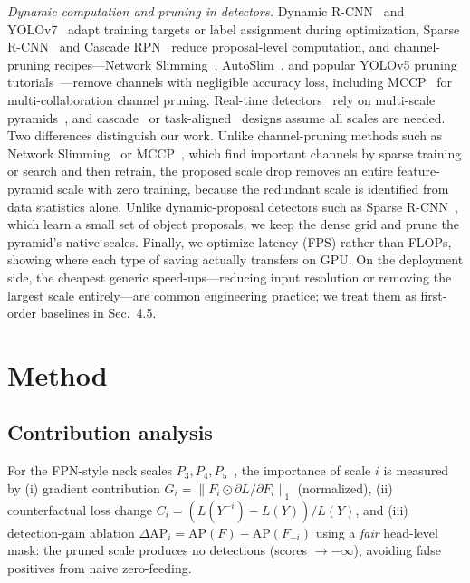 \documentclass[3p]{elsarticle}
\begin{document}
\emph{Dynamic computation and pruning in detectors.} Dynamic R-CNN~\cite{zhang2020dynamicrcnn} and YOLOv7~\cite{wang2023yolov7} adapt training targets or label assignment during optimization, Sparse R-CNN~\cite{sun2021sparsercnn} and Cascade RPN~\cite{vu2019cascaderpn} reduce proposal-level computation, and channel-pruning recipes---Network Slimming~\cite{liu2017networkslimming}, AutoSlim~\cite{yu2020autoslim}, and popular YOLOv5 pruning tutorials~\cite{ultralytics2023yolov5}---remove channels with negligible accuracy loss, including MCCP~\cite{yan2023mccp} for multi-collaboration channel pruning. Real-time detectors~\cite{redmon2016yolo,tian2019fcos,lin2017focal,jocher2026ultralyticsyolo26unifiedrealtime} rely on multi-scale pyramids~\cite{lin2017fpn}, and cascade~\cite{cai2018cascade} or task-aligned~\cite{feng2021tood} designs assume all scales are needed. Two differences distinguish our work. Unlike channel-pruning methods such as Network Slimming~\cite{liu2017networkslimming} or MCCP~\cite{yan2023mccp}, which find important channels by sparse training or search and then retrain, the proposed scale drop removes an entire feature-pyramid scale with zero training, because the redundant scale is identified from data statistics alone. Unlike dynamic-proposal detectors such as Sparse R-CNN~\cite{sun2021sparsercnn}, which learn a small set of object proposals, we keep the dense grid and prune the pyramid's native scales. Finally, we optimize latency (FPS) rather than FLOPs, showing where each type of saving actually transfers on GPU. On the deployment side, the cheapest generic speed-ups---reducing input resolution or removing the largest scale entirely---are common engineering practice; we treat them as first-order baselines in Sec.~4.5.
\section{Method}\label{sec:method}
\subsection{Contribution analysis}
For the FPN-style neck scales $P_3,P_4,P_5$~\cite{lin2017fpn}, the importance of scale $i$ is measured by (i) gradient contribution $G_i=\|F_i\odot\partial L/\partial F_i\|_1$ (normalized), (ii) counterfactual loss change $C_i=(L(Y^{-i})-L(Y))/L(Y)$, and (iii) detection-gain ablation $\Delta\text{AP}_i=\text{AP}(F)-\text{AP}(F_{-i})$ using a \emph{fair} head-level mask: the pruned scale produces no detections (scores $\to-\infty$), avoiding false positives from naive zero-feeding.
\end{document}
